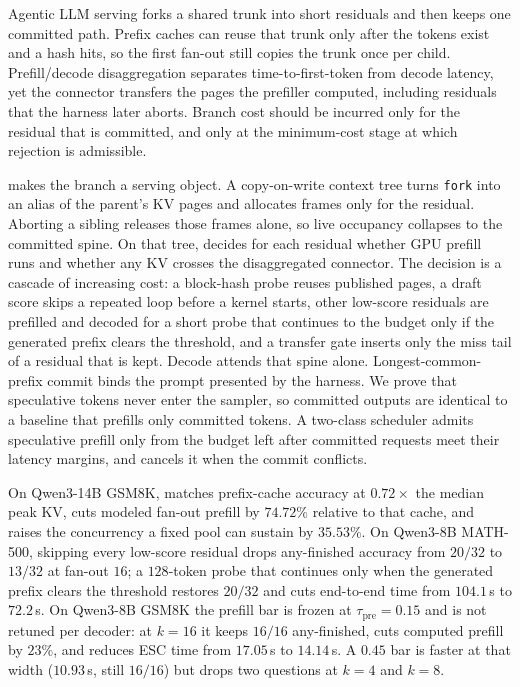 Agentic LLM serving forks a shared trunk into short residuals and then keeps one committed path.
Prefix caches can reuse that trunk only after the tokens exist and a hash hits, so the first fan-out still copies the trunk once per child.
Prefill/decode disaggregation separates time-to-first-token from decode latency, yet the connector transfers the pages the prefiller computed, including residuals that the harness later aborts.
Branch cost should be incurred only for the residual that is committed, and only at the minimum-cost stage at which rejection is admissible.

\sys makes the branch a serving object.
A copy-on-write context tree turns \texttt{fork} into an alias of the parent's KV pages and allocates frames only for the residual.
Aborting a sibling releases those frames alone, so live occupancy collapses to the committed spine.
On that tree, \sys decides for each residual whether GPU prefill runs and whether any KV crosses the disaggregated connector.
The decision is a cascade of increasing cost: a block-hash probe reuses published pages, a draft score skips a repeated loop before a kernel starts, other low-score residuals are prefilled and decoded for a short probe that continues to the budget only if the generated prefix clears the threshold, and a transfer gate inserts only the miss tail of a residual that is kept.
Decode attends that spine alone.
Longest-common-prefix commit binds the prompt presented by the harness.
We prove that speculative tokens never enter the sampler, so committed outputs are identical to a baseline that prefills only committed tokens.
A two-class scheduler admits speculative prefill only from the budget left after committed requests meet their latency margins, and cancels it when the commit conflicts.

On Qwen3-14B GSM8K, \sys matches prefix-cache accuracy at $0.72\times$ the median peak KV, cuts modeled fan-out prefill by $74.72\%$ relative to that cache, and raises the concurrency a fixed pool can sustain by $35.53\%$.
On Qwen3-8B MATH-500, skipping every low-score residual drops any-finished accuracy from $20/32$ to $13/32$ at fan-out $16$; a $128$-token probe that continues only when the generated prefix clears the threshold restores $20/32$ and cuts end-to-end time from $104.1$\,s to $72.2$\,s.
On Qwen3-8B GSM8K the prefill bar is frozen at $\tau_{\mathrm{pre}}{=}0.15$ and is not retuned per decoder: at $k{=}16$ it keeps $16/16$ any-finished, cuts computed prefill by $23\%$, and reduces ESC time from $17.05$\,s to $14.14$\,s.
A $0.45$ bar is faster at that width ($10.93$\,s, still $16/16$) but drops two questions at $k{=}4$ and $k{=}8$.
